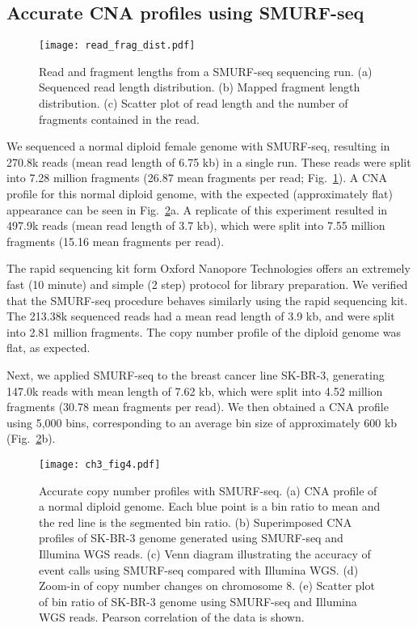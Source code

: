 \subsection{Accurate CNA profiles using SMURF-seq}
\begin{figure}[t!]
\centering
\texttt{[image: read\_frag\_dist.pdf]}
\caption[Read and fragment lengths from a SMURF-seq sequencing run.]{
  Read and fragment lengths from a SMURF-seq sequencing run.
  (a) Sequenced read length distribution.
  (b) Mapped fragment length distribution.
  (c) Scatter plot of read length and the number of fragments contained
  in the read.}
\label{read_frag_dist}
\end{figure}

We sequenced a normal diploid female genome with SMURF-seq, resulting in
270.8k reads (mean read length of 6.75 kb) in a single run. These reads
were split into 7.28 million fragments (26.87 mean fragments per read;
Fig.~\ref{read_frag_dist}).  A CNA profile for this normal diploid
genome, with the expected (approximately flat) appearance can be seen in
Fig.~\ref{cnv}a.
A replicate of this experiment resulted in 497.9k reads (mean read
length of 3.7 kb), which were split into 7.55 million fragments (15.16
mean fragments per read).

The rapid sequencing kit form Oxford Nanopore Technologies offers an
extremely fast (10 minute) and simple (2 step) protocol for library
preparation. We verified that the SMURF-seq procedure behaves similarly
using the rapid sequencing kit. The 213.38k sequenced reads had a mean
read length of 3.9 kb, and were split into 2.81 million fragments.  The
copy number profile of the diploid genome was flat, as expected.

Next, we applied SMURF-seq to the breast cancer line SK-BR-3, generating
147.0k reads with mean length of 7.62 kb, which were split into 4.52
million fragments (30.78 mean fragments per read). We then obtained a
CNA profile using 5,000 bins, corresponding to an average bin size of
approximately 600 kb (Fig.~\ref{cnv}b).

\begin{figure}[b!]
\centering
\texttt{[image: ch3\_fig4.pdf]}
\caption[Accurate copy number profiles with SMURF-seq.]{
  Accurate copy number profiles with SMURF-seq.
  (a) CNA profile of a normal diploid genome. Each blue point is a
  bin ratio to mean and the red line is the segmented bin ratio.
  (b) Superimposed CNA profiles of SK-BR-3 genome generated using
  SMURF-seq and Illumina WGS reads.
  (c) Venn diagram illustrating the accuracy of event calls using
  SMURF-seq compared with Illumina WGS.
  (d) Zoom-in of copy number changes on chromosome 8.
  (e) Scatter plot of bin ratio of SK-BR-3 genome using
  SMURF-seq and Illumina WGS reads. Pearson correlation of the data
  is shown.}
\label{cnv}
\end{figure}

